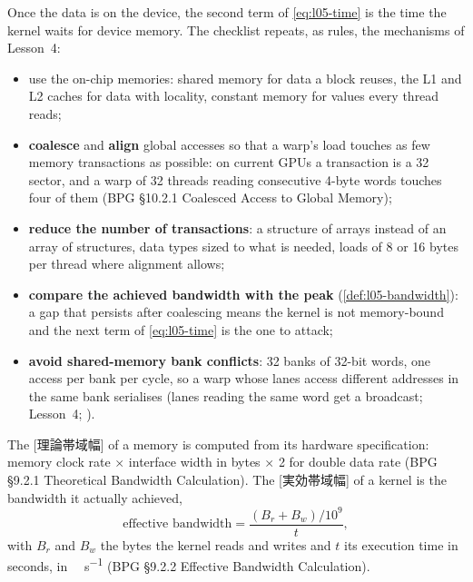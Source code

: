 \documentclass[../main.tex]{subfiles}
\begin{document}
Once the data is on the device, the second term of \cref{eq:l05-time} is
the time the kernel waits for device memory.  The checklist repeats, as rules,
the mechanisms of Lesson~4:
\begin{itemize}
  \item use the on-chip memories: shared memory for data a block
    reuses, the L1 and L2 caches for data with locality, constant
    memory for values every thread reads;
  \item \textbf{coalesce} and \textbf{align} global accesses so that a
    warp's load touches as few memory transactions as possible: on
    current GPUs a transaction is a \SI{32}{\byte} sector, and a warp of
    32 threads reading consecutive 4-byte words touches four of them
    (BPG §10.2.1 Coalesced Access to Global Memory);
  \item \textbf{reduce the number of transactions}: a structure of
    arrays instead of an array of structures, data types sized to what
    is needed, loads of 8 or 16 bytes per thread where alignment allows;
  \item \textbf{compare the achieved bandwidth with the peak}
    (\cref{def:l05-bandwidth}): a gap that persists after coalescing
    means the kernel is not memory-bound and the next term of
    \cref{eq:l05-time} is the one to attack;
  \item \textbf{avoid shared-memory bank conflicts}: 32 banks of
    32-bit words, one access per bank per cycle, so a warp whose lanes
    access different addresses in the same bank serialises (lanes
    reading the same word get a broadcast; Lesson~4;
    \cite{harris2013sharedmem}).
\end{itemize}

\begin{definition}
  \label{def:l05-bandwidth}
  The [理論帯域幅] of a memory is computed
  from its hardware specification: memory clock rate $\times$ interface
  width in bytes $\times$ 2 for double data rate (BPG §9.2.1
  Theoretical Bandwidth Calculation).  The
  [実効帯域幅] of a kernel is the bandwidth it
  actually achieved,
  \begin{equation}
    \text{effective bandwidth} = \frac{(B_r + B_w)/10^9}{t},
    \label{eq:l05-effective-bw}
  \end{equation}
  with $B_r$ and $B_w$ the bytes the kernel reads and writes and $t$ its
  execution time in seconds, in \si{\giga\byte\per\second} (BPG §9.2.2
  Effective Bandwidth Calculation).
\end{definition}
\end{document}
